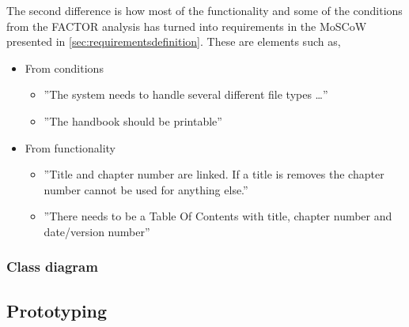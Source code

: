 The second difference is how most of the functionality and some of the conditions from the FACTOR analysis has turned into requirements in the MoSCoW presented in \cref{sec:requirementsdefinition}. These are elements such as,
\begin{itemize}
	\item From conditions
	\begin{itemize}
		\item 
		''The system needs to handle several different file types \ldots''
		\item 
		''The handbook should be printable''
	\end{itemize}
	\item From functionality
	\begin{itemize}
		\item 
		''Title and chapter number are linked. If a title is removes the chapter number cannot be used for anything else.''
		\item 
		''There needs to be a Table Of Contents with title, chapter number and date/version number''
	\end{itemize}
\end{itemize}

\subsubsection*{Class diagram}

\subsection{Prototyping}
